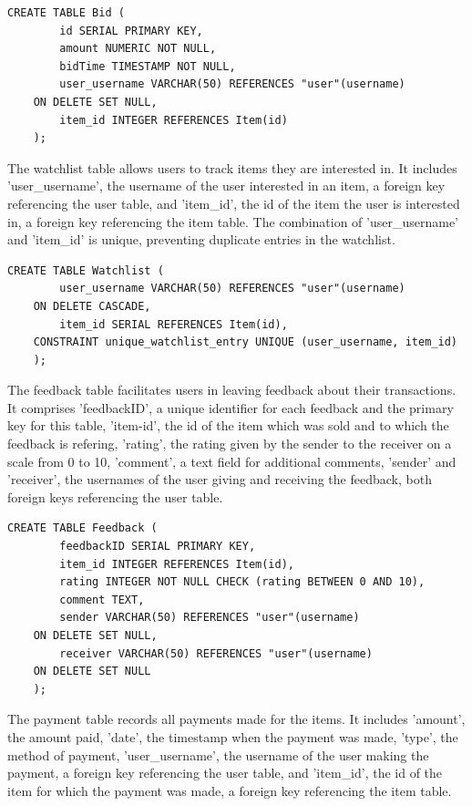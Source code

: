 \begin{lstlisting}[style=sqlStyle]
	CREATE TABLE Bid (
		id SERIAL PRIMARY KEY,
		amount NUMERIC NOT NULL,
		bidTime TIMESTAMP NOT NULL,
		user_username VARCHAR(50) REFERENCES "user"(username)
	ON DELETE SET NULL,
		item_id INTEGER REFERENCES Item(id)
	);
\end{lstlisting}

The watchlist table allows users to track items they are interested in. It includes 'user\_username', the username of the user interested in an item, a foreign key referencing the user table, and 'item\_id', the id of the item the user is interested in, a foreign key referencing the item table. The combination of 'user\_username' and 'item\_id' is unique, preventing duplicate entries in the watchlist.

\begin{lstlisting}[style=sqlStyle]
	CREATE TABLE Watchlist (
		user_username VARCHAR(50) REFERENCES "user"(username)
	ON DELETE CASCADE,
		item_id SERIAL REFERENCES Item(id),
	CONSTRAINT unique_watchlist_entry UNIQUE (user_username, item_id)
	);
\end{lstlisting}

The feedback table facilitates users in leaving feedback about their transactions. It comprises 'feedbackID', a unique identifier for each feedback and the primary key for this table, 'item-id', the id of the item which was sold and to which the feedback is refering, 'rating', the rating given by the sender to the receiver on a scale from 0 to 10, 'comment', a text field for additional comments, 'sender' and 'receiver', the usernames of the user giving and receiving the feedback, both foreign keys referencing the user table.

\begin{lstlisting}[style=sqlStyle]
	CREATE TABLE Feedback (
		feedbackID SERIAL PRIMARY KEY,
		item_id INTEGER REFERENCES Item(id),
		rating INTEGER NOT NULL CHECK (rating BETWEEN 0 AND 10),
		comment TEXT,
		sender VARCHAR(50) REFERENCES "user"(username)
	ON DELETE SET NULL,
		receiver VARCHAR(50) REFERENCES "user"(username)
	ON DELETE SET NULL
	);
\end{lstlisting}

The payment table records all payments made for the items. It includes 'amount', the amount paid, 'date', the timestamp when the payment was made, 'type', the method of payment, 'user\_username', the username of the user making the payment, a foreign key referencing the user table, and 'item\_id', the id of the item for which the payment was made, a foreign key referencing the item table.

